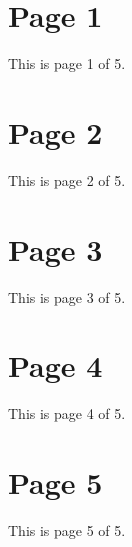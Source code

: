 \documentclass{article}
\begin{document}
\section{Page 1}
This is page 1 of 5.
\newpage
\section{Page 2}
This is page 2 of 5.
\newpage
\section{Page 3}
This is page 3 of 5.
\newpage
\section{Page 4}
This is page 4 of 5.
\newpage
\section{Page 5}
This is page 5 of 5.
\end{document}
